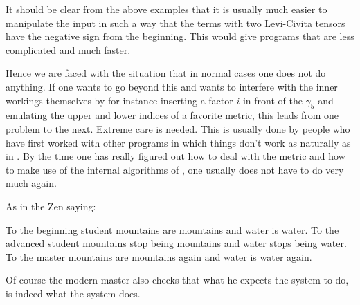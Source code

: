 \noindent It should be clear from the above examples that it is usually 
much easier to manipulate the input in such a way that the terms with two 
Levi-Civita tensors have the negative sign from the beginning. This would 
give programs that are less complicated and much faster. \hfill \vspace{2mm}

\noindent Hence we are faced with the situation that in normal cases one 
does not do anything. If one wants to go beyond this and wants to interfere 
with the inner workings themselves by for instance inserting a factor $i$ 
in front of the $\gamma_5$ and emulating the upper and lower indices of a 
favorite metric, this leads from one problem to the next. Extreme care is 
needed. This is usually done by people who have first worked with other 
programs in which things don't work as naturally as in \FORM. By the time 
one has really figured out how to deal with the metric and how to make use 
of the internal algorithms of \FORM, one usually does not have to do very 
much again. \hfill \vspace{2mm}

\noindent As in the Zen saying: \hfill \vspace{2mm}

\noindent To the beginning student mountains are mountains 
and water is water. To the advanced student 
mountains stop being mountains and water stops being water. To the 
master mountains are mountains again and water is water 
again. \hfill \vspace{2mm}

\noindent Of course the modern master also checks that what he expects the 
system to do, is indeed what the system does.
